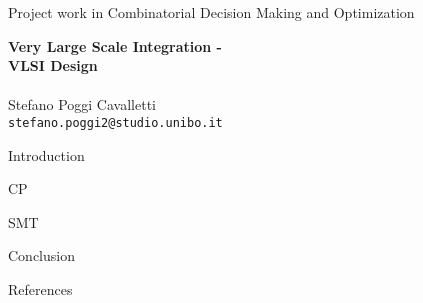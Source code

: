 \documentclass[11pt]{article}
\begin{document}
\begin{center}

\Large Project work in Combinatorial Decision Making and Optimization

{\huge \bfseries Very Large Scale Integration - \\ VLSI Design}\\[0.5 cm]

\large
\emph \\
Stefano Poggi Cavalletti
\\
\verb|stefano.poggi2@studio.unibo.it|

\end{center}

\frontmatter

\tableofcontents

\newpage


{Introduction}

{CP}

{SMT}

{Conclusion}

{References}

\newpage
\printbibliography[heading = bibintoc, title = Bibliography]    %

\end{document}
